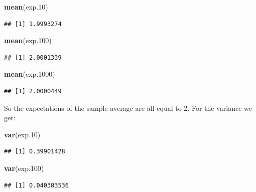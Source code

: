 \documentclass[]{krantz}
\makeatletter
\newenvironment{Shaded}{\begin{snugshade}}{\end{snugshade}}
\newcommand{\FloatTok}[1]{\textcolor[rgb]{0.00,0.00,0.81}{#1}}
\newcommand{\KeywordTok}[1]{\textcolor[rgb]{0.13,0.29,0.53}{\textbf{#1}}}
\newcommand{\NormalTok}[1]{#1}
\newenvironment{kframe}{%
\medskip{}
\setlength{\fboxsep}{.8em}
 \def\at@end@of@kframe{}%
 \ifinner\ifhmode%
  \def\at@end@of@kframe{\end{minipage}}%
  \begin{minipage}{\columnwidth}%
 \fi\fi%
 \def\FrameCommand##1{\hskip\@totalleftmargin \hskip-\fboxsep
 \colorbox{shadecolor}{##1}\hskip-\fboxsep
     \hskip-\linewidth \hskip-\@totalleftmargin \hskip\columnwidth}%
 \MakeFramed {\advance\hsize-\width
   \@totalleftmargin\z@ \linewidth\hsize
   \@setminipage}}%
 {\par\unskip\endMakeFramed%
 \at@end@of@kframe}
\renewenvironment{Shaded}{\begin{kframe}}{\end{kframe}}
\theoremstyle{definition}
\theoremstyle{definition}
\theoremstyle{definition}
\theoremstyle{remark}
\makeatother
\begin{document}
\begin{Shaded}
\begin{Highlighting}[]
\KeywordTok{mean}\NormalTok{(exp}\FloatTok{.10}\NormalTok{)}
\end{Highlighting}
\end{Shaded}

\begin{verbatim}
## [1] 1.9993274
\end{verbatim}

\begin{Shaded}
\begin{Highlighting}[]
\KeywordTok{mean}\NormalTok{(exp}\FloatTok{.100}\NormalTok{)}
\end{Highlighting}
\end{Shaded}

\begin{verbatim}
## [1] 2.0001339
\end{verbatim}

\begin{Shaded}
\begin{Highlighting}[]
\KeywordTok{mean}\NormalTok{(exp}\FloatTok{.1000}\NormalTok{)}
\end{Highlighting}
\end{Shaded}

\begin{verbatim}
## [1] 2.0000449
\end{verbatim}

So the expectations of the sample average are all equal to 2. For the
variance we get:

\begin{Shaded}
\begin{Highlighting}[]
\KeywordTok{var}\NormalTok{(exp}\FloatTok{.10}\NormalTok{)}
\end{Highlighting}
\end{Shaded}

\begin{verbatim}
## [1] 0.39901428
\end{verbatim}

\begin{Shaded}
\begin{Highlighting}[]
\KeywordTok{var}\NormalTok{(exp}\FloatTok{.100}\NormalTok{)}
\end{Highlighting}
\end{Shaded}

\begin{verbatim}
## [1] 0.040383536
\end{verbatim}
\end{document}

